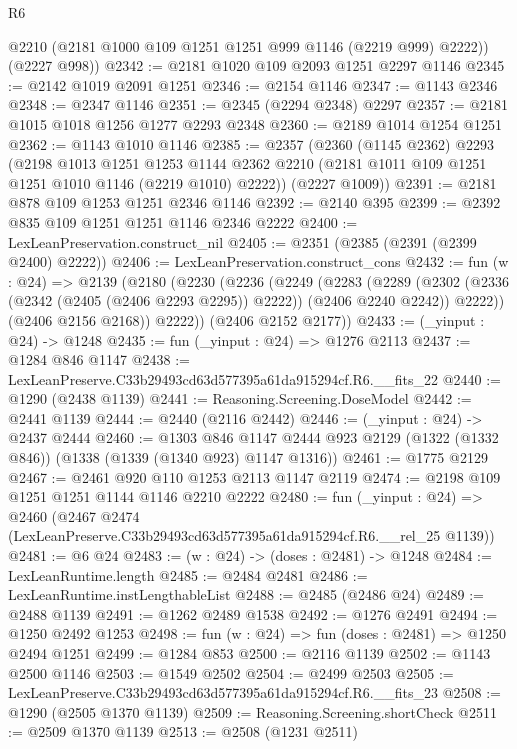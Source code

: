 \begin{lexlean}{R6}
\begin{coremodule}
        @2210
        (@2181 @1000 @109 @1251 @1251 @999 @1146 (@2219 @999) @2222))
      (@2227 @998))
@2342 := @2181 @1020 @109 @2093 @1251 @2297 @1146
@2345 := @2142 @1019 @2091 @1251
@2346 := @2154 @1146
@2347 := @1143 @2346
@2348 := @2347 @1146
@2351 := @2345 (@2294 @2348) @2297
@2357 := @2181 @1015 @1018 @1256 @1277 @2293 @2348
@2360 := @2189 @1014 @1254 @1251
@2362 := @1143 @1010 @1146
@2385 := @2357
    (@2360
      (@1145 @2362)
      @2293
      (@2198
        @1013
        @1251
        @1253
        @1144
        @2362
        @2210
        (@2181 @1011 @109 @1251 @1251 @1010 @1146 (@2219 @1010) @2222))
      (@2227 @1009))
@2391 := @2181 @878 @109 @1253 @1251 @2346 @1146
@2392 := @2140 @395
@2399 := @2392 @835 @109 @1251 @1251 @1146 @2346 @2222
@2400 := LexLeanPreservation.construct_nil
@2405 := @2351 (@2385 (@2391 (@2399 @2400) @2222))
@2406 := LexLeanPreservation.construct_cons
@2432 := fun (w : @24) =>
  @2139
    (@2180
      (@2230
        (@2236
          (@2249
            (@2283
              (@2289
                (@2302 (@2336 (@2342 (@2405 (@2406 @2293 @2295)) @2222)) (@2406 @2240 @2242))
                @2222))
            (@2406 @2156 @2168))
          @2222))
      (@2406 @2152 @2177))
@2433 := (_yinput : @24) -> @1248
@2435 := fun (_yinput : @24) => @1276 @2113
@2437 := @1284 @846 @1147
@2438 := LexLeanPreserve.C33b29493cd63d577395a61da915294cf.R6.__fits_22
@2440 := @1290 (@2438 @1139)
@2441 := Reasoning.Screening.DoseModel
@2442 := @2441 @1139
@2444 := @2440 (@2116 @2442)
@2446 := (_yinput : @24) -> @2437 @2444
@2460 := @1303
    @846
    @1147
    @2444
    @923
    @2129
    (@1322 (@1332 @846))
    (@1338 (@1339 (@1340 @923) @1147 @1316))
@2461 := @1775 @2129
@2467 := @2461 @920 @110 @1253 @2113 @1147 @2119
@2474 := @2198 @109 @1251 @1251 @1144 @1146 @2210 @2222
@2480 := fun (_yinput : @24) =>
  @2460 (@2467 @2474 (LexLeanPreserve.C33b29493cd63d577395a61da915294cf.R6.__rel_25 @1139))
@2481 := @6 @24
@2483 := (w : @24) -> (doses : @2481) -> @1248
@2484 := LexLeanRuntime.length
@2485 := @2484 @2481
@2486 := LexLeanRuntime.instLengthableList
@2488 := @2485 (@2486 @24)
@2489 := @2488 @1139
@2491 := @1262 @2489 @1538
@2492 := @1276 @2491
@2494 := @1250 @2492 @1253
@2498 := fun (w : @24) => fun (doses : @2481) => @1250 @2494 @1251
@2499 := @1284 @853
@2500 := @2116 @1139
@2502 := @1143 @2500 @1146
@2503 := @1549 @2502
@2504 := @2499 @2503
@2505 := LexLeanPreserve.C33b29493cd63d577395a61da915294cf.R6.__fits_23
@2508 := @1290 (@2505 @1370 @1139)
@2509 := Reasoning.Screening.shortCheck
@2511 := @2509 @1370 @1139
@2513 := @2508 (@1231 @2511)

\end{coremodule}
\end{lexlean}
